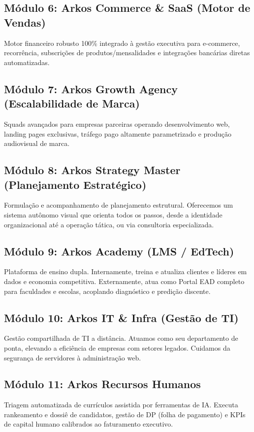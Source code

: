 \documentclass[12pt,a4paper,oneside]{report}
\begin{document}
\subsection{Módulo 6: Arkos Commerce \& SaaS (Motor de Vendas)}
Motor financeiro robusto 100\% integrado à gestão executiva para e-commerce, recorrência, subscrições de produtos/mensalidades e integrações bancárias diretas automatizadas.

\subsection{Módulo 7: Arkos Growth Agency (Escalabilidade de Marca)}
Squads avançados para empresas parceiras operando desenvolvimento web, landing pages exclusivas, tráfego pago altamente parametrizado e produção audiovisual de marca.

\subsection{Módulo 8: Arkos Strategy Master (Planejamento Estratégico)}
Formulação e acompanhamento de planejamento estrutural. Oferecemos um sistema autônomo visual que orienta todos os passos, desde a identidade organizacional até a operação tática, ou via consultoria especializada.

\subsection{Módulo 9: Arkos Academy (LMS / EdTech)}
Plataforma de ensino dupla. Internamente, treina e atualiza clientes e líderes em dados e economia competitiva. Externamente, atua como Portal EAD completo para faculdades e escolas, acoplando diagnóstico e predição discente.

\subsection{Módulo 10: Arkos IT \& Infra (Gestão de TI)}
Gestão compartilhada de TI a distância. Atuamos como seu departamento de ponta, elevando a eficiência de empresas com setores legados. Cuidamos da segurança de servidores à administração web.

\subsection{Módulo 11: Arkos Recursos Humanos}
Triagem automatizada de currículos assistida por ferramentas de IA. Executa rankeamento e dossiê de candidatos, gestão de DP (folha de pagamento) e KPIs de capital humano calibrados ao faturamento executivo.
\end{document}
